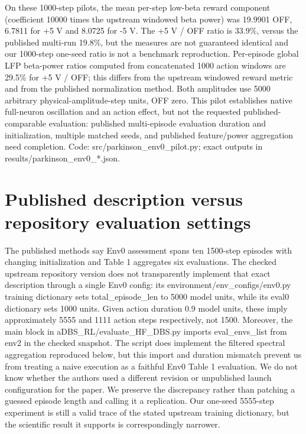 On these 1000-step pilots, the mean per-step low-beta reward component (coefficient 10000 times the upstream windowed beta power) was 19.9901 OFF, 6.7811 for +5 V and 8.0725 for -5 V. The +5 V / OFF ratio is 33.9\%, versus the published multi-run 19.8\%, but the measures are not guaranteed identical and our 1000-step one-seed ratio is not a benchmark reproduction. Per-episode global LFP beta-power ratios computed from concatenated 1000 action windows are 29.5\% for +5 V / OFF; this differs from the upstream windowed reward metric and from the published normalization method. Both amplitudes use 5000 arbitrary physical-amplitude-step units, OFF zero. This pilot establishes native full-neuron oscillation and an action effect, but not the requested published-comparable evaluation: published multi-episode evaluation duration and initialization, multiple matched seeds, and published feature/power aggregation need completion. Code: src/parkinson\_env0\_pilot.py; exact outputs in results/parkinson\_env0\_*.json.

\section{Published description versus repository evaluation settings}
The published methods say Env0 assessment spans ten 1500-step episodes with changing initialization and Table 1 aggregates six evaluations. The checked upstream repository version does not transparently implement that exact description through a single Env0 config: its environment/env\_configs/env0.py training dictionary sets total\_episode\_len to 5000 model units, while its eval0 dictionary sets 1000 units. Given action duration 0.9 model units, these imply approximately 5555 and 1111 action steps respectively, not 1500. Moreover, the main block in aDBS\_RL/evaluate\_HF\_DBS.py imports eval\_envs\_list from env2 in the checked snapshot. The script does implement the filtered spectral aggregation reproduced below, but this import and duration mismatch prevent us from treating a naive execution as a faithful Env0 Table 1 evaluation. We do not know whether the authors used a different revision or unpublished launch configuration for the paper. We preserve the discrepancy rather than patching a guessed episode length and calling it a replication. Our one-seed 5555-step experiment is still a valid trace of the stated upstream training dictionary, but the scientific result it supports is correspondingly narrower.

